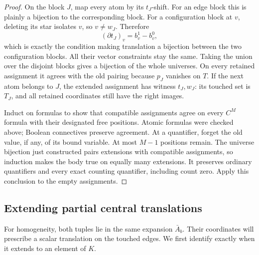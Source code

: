 \begin{proof}
On the block $J$, map every atom by its $t_J$-shift.  For an edge block
this is plainly a bijection to the corresponding block.  For a
configuration block at $v$, deleting its star isolates $v$, so
$v\ne w_J$.  Therefore
\[
 (\partial t_J)_v=b^1_v-b^0_v,
\]
which is exactly the condition making translation a bijection between
the two configuration blocks.  All their vector constraints stay the
same.  Taking the union over the disjoint blocks gives a bijection of
the whole universes.  On every retained assignment it agrees with the
old pairing because $p_J$ vanishes on $T$.  If the next atom belongs
to $J$, the extended assignment has witness $t_J,w_J$: its touched
set is $T_J$, and all retained coordinates still have the right images.

Induct on formulas to show that compatible assignments agree on every
$C^M$ formula with their designated free positions.  Atomic formulas
were checked above; Boolean connectives preserve agreement.  At a
quantifier, forget the old value, if any, of its bound variable.  At
most $M-1$ positions remain.  The universe bijection just constructed
pairs extensions with compatible assignments, so induction makes the
body true on equally many extensions.  It preserves ordinary
quantifiers and every exact counting quantifier, including count zero.
Apply this conclusion to the empty assignments.
\end{proof}

\subsection{Extending partial central translations}

For homogeneity, both tuples lie in the same expansion $\bar A_b$.
Their coordinates will prescribe a scalar translation on the touched
edges.  We first identify exactly when it extends to an element of $K$.

